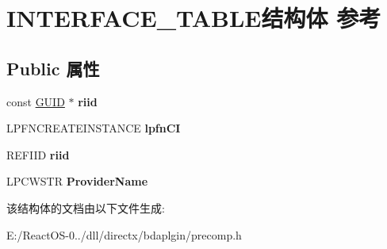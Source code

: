 \hypertarget{struct_i_n_t_e_r_f_a_c_e___t_a_b_l_e}{}\section{I\+N\+T\+E\+R\+F\+A\+C\+E\+\_\+\+T\+A\+B\+L\+E结构体 参考}
\label{struct_i_n_t_e_r_f_a_c_e___t_a_b_l_e}
\subsection*{Public 属性}
\begin{DoxyCompactItemize}
\item 
\mbox{\label{struct_i_n_t_e_r_f_a_c_e___t_a_b_l_e_af878dbd9326259f882c063af1b18dbf7}} 
const \hyperlink{interface_g_u_i_d}{G\+U\+ID} $\ast$ {\bfseries riid}
\item 
\mbox{\label{struct_i_n_t_e_r_f_a_c_e___t_a_b_l_e_aa7ce9d5781476de8b399ef6ac2aa845d}} 
L\+P\+F\+N\+C\+R\+E\+A\+T\+E\+I\+N\+S\+T\+A\+N\+CE {\bfseries lpfn\+CI}
\item 
\mbox{\label{struct_i_n_t_e_r_f_a_c_e___t_a_b_l_e_af878dbd9326259f882c063af1b18dbf7}} 
R\+E\+F\+I\+ID {\bfseries riid}
\item 
\mbox{\label{struct_i_n_t_e_r_f_a_c_e___t_a_b_l_e_a597bde0d04f6a48ced9b021008adb75a}} 
L\+P\+C\+W\+S\+TR {\bfseries Provider\+Name}
\end{DoxyCompactItemize}


该结构体的文档由以下文件生成\+:\begin{DoxyCompactItemize}
\item 
E\+:/\+React\+O\+S-\/0../dll/directx/bdaplgin/precomp.\+h\end{DoxyCompactItemize}

